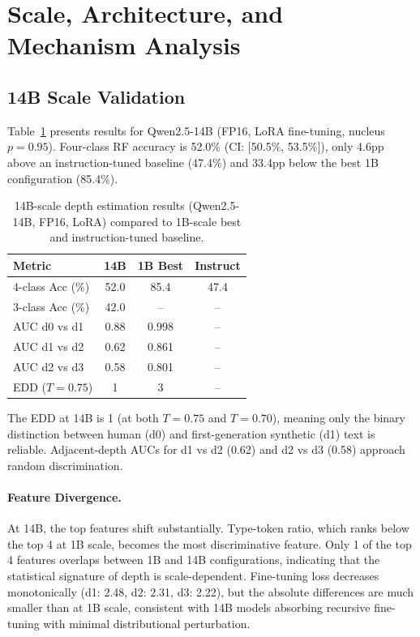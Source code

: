 \documentclass[11pt,a4paper]{article}
\begin{document}
\section{Scale, Architecture, and Mechanism Analysis}

\subsection{14B Scale Validation}

Table~\ref{tab:14b} presents results for Qwen2.5-14B (FP16, LoRA fine-tuning, nucleus $p{=}0.95$). Four-class RF accuracy is 52.0\% (CI: [50.5\%, 53.5\%]), only 4.6pp above an instruction-tuned baseline (47.4\%) and 33.4pp below the best 1B configuration (85.4\%).

\begin{table}[t]
\centering
\caption{14B-scale depth estimation results (Qwen2.5-14B, FP16, LoRA) compared to 1B-scale best and instruction-tuned baseline.}
\label{tab:14b}
\small
\begin{tabular}{lccc}
\toprule
\textbf{Metric} & \textbf{14B} & \textbf{1B Best} & \textbf{Instruct} \\
\midrule
4-class Acc (\%) & 52.0 & 85.4 & 47.4 \\
3-class Acc (\%) & 42.0 & -- & -- \\
AUC d0 vs d1 & 0.88 & 0.998 & -- \\
AUC d1 vs d2 & 0.62 & 0.861 & -- \\
AUC d2 vs d3 & 0.58 & 0.801 & -- \\
EDD ($T{=}0.75$) & 1 & 3 & -- \\
\bottomrule
\end{tabular}
\end{table}

The EDD at 14B is 1 (at both $T{=}0.75$ and $T{=}0.70$), meaning only the binary distinction between human (d0) and first-generation synthetic (d1) text is reliable. Adjacent-depth AUCs for d1 vs d2 (0.62) and d2 vs d3 (0.58) approach random discrimination.

\paragraph{Feature Divergence.}
At 14B, the top features shift substantially. Type-token ratio, which ranks below the top 4 at 1B scale, becomes the most discriminative feature. Only 1 of the top 4 features overlaps between 1B and 14B configurations, indicating that the statistical signature of depth is scale-dependent. Fine-tuning loss decreases monotonically (d1: 2.48, d2: 2.31, d3: 2.22), but the absolute differences are much smaller than at 1B scale, consistent with 14B models absorbing recursive fine-tuning with minimal distributional perturbation.
\end{document}
